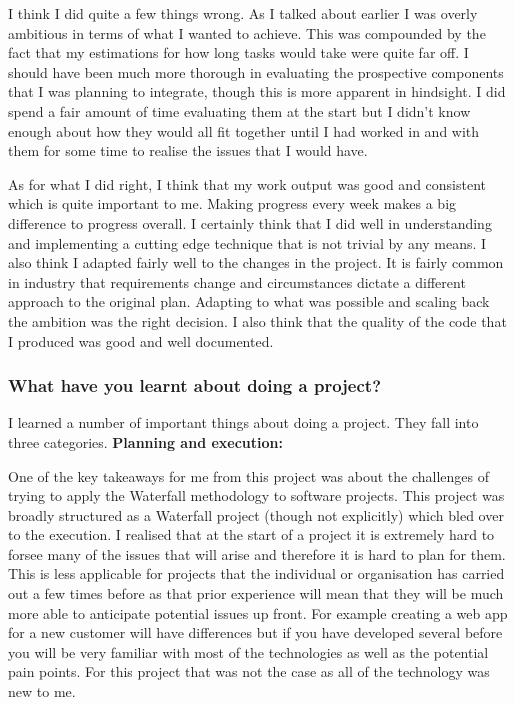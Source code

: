 \documentclass[]{../resources/final_report}
\begin{document}
I think I did quite a few things wrong. As I talked about earlier I was overly ambitious in terms of what I wanted to achieve. This was compounded by the fact that my estimations for how long tasks would take were quite far off. I should have been much more thorough in evaluating the prospective components that I was planning to integrate, though this is more apparent in hindsight. I did spend a fair amount of time evaluating them at the start but I didn't know enough about how they would all fit together until I had worked in and with them for some time to realise the issues that I would have.

As for what I did right, I think that my work output was good and consistent which is quite important to me. Making progress every week makes a big difference to progress overall. I certainly think that I did well in understanding and implementing a cutting edge technique that is not trivial by any means. I also think I adapted fairly well to the changes in the project. It is fairly common in industry that requirements change and circumstances dictate a different approach to the original plan. Adapting to what was possible and scaling back the ambition was the right decision. I also think that the quality of the code that I produced was good and well documented.

\subsubsection{What have you learnt about doing a project?}

I learned a number of important things about doing a project. They fall into three categories.
\textbf{Planning and execution:}

One of the key takeaways for me from this project was about the challenges of trying to apply the Waterfall methodology to software projects. This project was broadly structured as a Waterfall project (though not explicitly) which bled over to the execution. I realised that at the start of a project it is extremely hard to forsee many of the issues that will arise and therefore it is hard to plan for them. This is less applicable for projects that the individual or organisation has carried out a few times before as that prior experience will mean that they will be much more able to anticipate potential issues up front. For example creating a web app for a new customer will have differences but if you have developed several before you will be very familiar with most of the technologies as well as the potential pain points. For this project that was not the case as all of the technology was new to me. 
\end{document}
